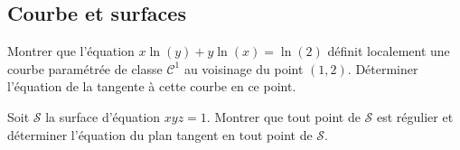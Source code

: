 \documentclass[a4paper,twoside,french,11pt]{VcCours}
\begin{document}
\subsection{Courbe et surfaces}


\begin{Exercice}{} Montrer que l'équation $x\ln(y)+y \ln(x) = \ln(2)$ définit localement une courbe paramétrée de classe $\mathcal{C}^1$ au voisinage du point $(1,2)$. Déterminer l'équation de la tangente à cette courbe en ce point.
\end{Exercice}


\begin{Exercice}{} Soit $\mathcal{S}$ la surface d'équation $xyz=1$. Montrer que tout point de $\mathcal{S}$ est régulier et déterminer l'équation du plan tangent en tout point de $\mathcal{S}$.
\end{Exercice}

%
\end{document}

